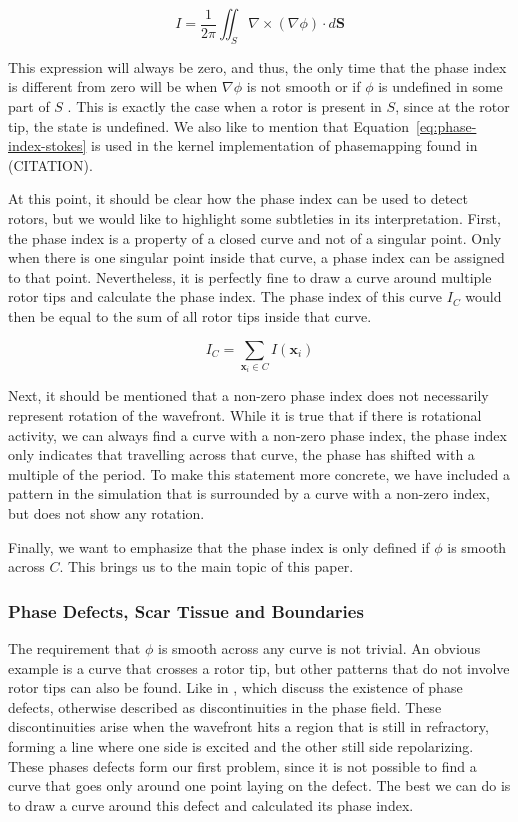 \documentclass[twocolumn]{article}
\begin{document}
\begin{equation}
  I = \frac{1}{2\pi} \iint_S \nabla \times (\nabla \phi) \cdot d\bm{S}
  \label{eq:phase-index-stokes}
\end{equation}

\noindent This expression will always be zero,
and thus, the only time that the phase index is different from zero will be when
$\nabla \phi$ is not smooth or if $\phi$ is undefined in some part of $S$ \autocite{herlin2012reconstruction}.
This is exactly the case when a rotor is present in $S$,
since at the rotor tip, the state is undefined.
We also like to mention that Equation~\ref{eq:phase-index-stokes}
is used in the kernel implementation of phasemapping found in (CITATION).

At this point, it should be clear how the phase index can be used to detect rotors,
but we would like to highlight some subtleties in its interpretation.
First, the phase index is a property of a closed curve
and not of a singular point.
Only when there is one singular point inside that curve,
a phase index can be assigned to that point.
Nevertheless, it is perfectly fine to draw a curve around multiple rotor tips
and calculate the phase index.
The phase index of this curve $I_C$ would then be equal to the sum of all rotor tips inside that curve.

\begin{equation}
  I_C = \sum_{\bm{x}_i\in C} I(\bm{x}_i)
  \label{eq:index-curve}
\end{equation}

Next, it should be mentioned that a non-zero phase index does not necessarily represent rotation of the wavefront.
While it is true that if there is rotational activity,
we can always find a curve with a non-zero phase index,
the phase index only indicates that travelling across that curve,
the phase has shifted with a multiple of the period.
To make this statement more concrete,
we have included a pattern in the simulation that is surrounded by a curve with a non-zero index,
but does not show any rotation.

Finally, we want to emphasize that the phase index is only defined if $\phi$ is smooth across $C$.
This brings us to the main topic of this paper.

\subsubsection{Phase Defects, Scar Tissue and Boundaries}

The requirement that $\phi$ is smooth across any curve is not trivial.
An obvious example is a curve that crosses a rotor tip,
but other patterns that do not involve rotor tips can also be found.
Like in \textcite{arno2021a, tomii2021spatial},
which discuss the existence of phase defects,
otherwise described as discontinuities in the phase field.
These discontinuities arise when the wavefront hits a region that is still in refractory,
forming a line where one side is excited and the other still side repolarizing.
These phases defects form our first problem,
since it is not possible to find a curve
that goes only around one point laying on the defect.
The best we can do is to draw a curve around this defect and calculated its phase index.
\end{document}
